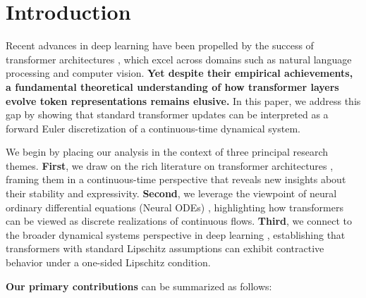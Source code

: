 \section{Introduction}
\label{sec:intro}
Recent advances in deep learning have been propelled by the success of transformer architectures \citep{vaswani2017attention}, which excel across domains such as natural language processing and computer vision. \textbf{Yet despite their empirical achievements, a fundamental theoretical understanding of how transformer layers evolve token representations remains elusive.} In this paper, we address this gap by showing that standard transformer updates can be interpreted as a forward Euler discretization of a continuous-time dynamical system. 

We begin by placing our analysis in the context of three principal research themes. \textbf{First}, we draw on the rich literature on transformer architectures \citep{devlin2019bert,radford2018improving,radford2019language}, framing them in a continuous-time perspective that reveals new insights about their stability and expressivity. \textbf{Second}, we leverage the viewpoint of neural ordinary differential equations (Neural ODEs) \citep{Chen2018NeuralODEs}, highlighting how transformers can be viewed as discrete realizations of continuous flows. \textbf{Third}, we connect to the broader dynamical systems perspective in deep learning \citep{ruthotto2018deep,haber2017stable}, establishing that transformers with standard Lipschitz assumptions can exhibit contractive behavior under a one-sided Lipschitz condition. 

\textbf{Our primary contributions} can be summarized as follows:


